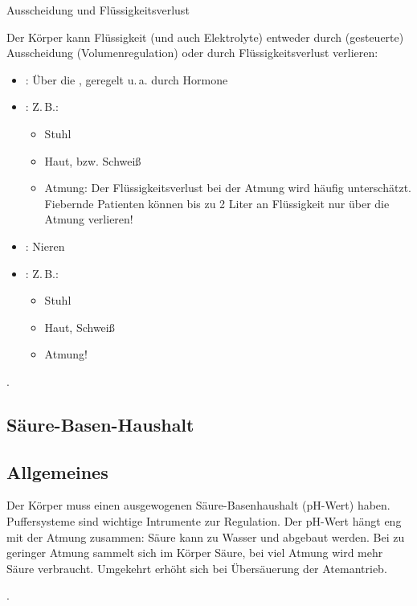 \documentclass[
ngerman,
paper=a4,
asymmetric,
fontsize=10pt,
draft=false,
numbers=noenddot,
bibtotocnumbered,
footnotes=multiple,
]{scrreprt}
\newcommand{\jALT}{\vspace{6pt}\noindent{\color{red}\sffamily\textbf{DELETED}\hrulefill\newline}}
\newcommand{\jALTende}{\newline{\color{red}\rule{\linewidth}{2pt}\newline}}
\newcommand{\jNEUende}{\newline{\color{green}\rule{\linewidth}{3pt}\newline}}
\begin{document}
{Ausscheidung und Flüssigkeitsverlust}
{%
Der Körper kann Flüssigkeit (und auch Elektrolyte) entweder
durch (gesteuerte) Ausscheidung (Volumenregulation) oder
durch Flüssigkeitsverlust verlieren:
 
\begin{itemize}
  \item {}: Über die , geregelt
  u.\,a. durch Hormone
  \item {}: Z.\,B.:
  \begin{itemize}
    \item Stuhl
    \item Haut, bzw. Schweiß
    \item Atmung: Der Flüssigkeitsverlust bei der Atmung
    wird häufig unterschätzt. Fiebernde Patienten können bis
    zu 2 Liter an Flüssigkeit nur über die Atmung verlieren!
  \end{itemize}
\end{itemize}
}
{%
\begin{itemize}
  \item {}: {Nieren}
  \item {}: Z.\,B.:
  \begin{itemize}
    \item Stuhl
    \item Haut, Schweiß
    \item Atmung!
  \end{itemize}
\end{itemize}
}
{}
{}
{}
 .
 \jNEUende

\subsection{Säure-Basen-Haushalt}
\jALT
\subsection{Allgemeines}

{Der Körper muss einen ausgewogenen Säure-Basenhaushalt
(pH-Wert) haben. Puffersysteme sind wichtige Intrumente zur
Regulation. Der pH-Wert hängt eng mit der Atmung zusammen:
Säure kann zu Wasser und  abgebaut werden. Bei zu
geringer Atmung sammelt sich im Körper Säure, bei
viel Atmung wird mehr Säure verbraucht. Umgekehrt erhöht
sich bei Übersäuerung der Atemantrieb. 

}{}{}{}{}
.
\jALTende
\end{document}
